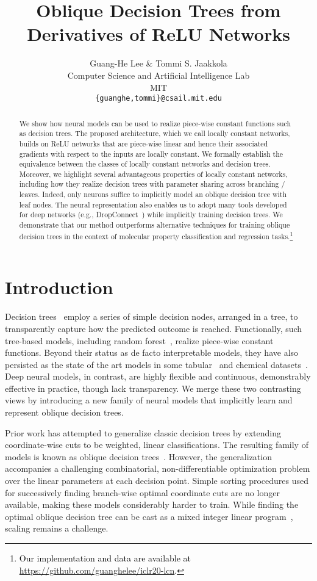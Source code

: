 \documentclass{article} \usepackage{iclr2020_conference,times}
\title{Oblique Decision Trees from Derivatives of ReLU Networks}
\author{Guang-He Lee \& Tommi S. Jaakkola \\
Computer Science and Artificial Intelligence Lab\\
MIT\\
\texttt{\{guanghe,tommi\}@csail.mit.edu} \\
}
\newcommand{\camera}[1]{\textcolor{black}{#1}}
\begin{document}
\maketitle

\begin{abstract}
We show how neural models can be used to realize piece-wise constant functions such as decision trees. The proposed architecture, which we call locally constant networks, builds on ReLU networks that are piece-wise linear and hence their associated gradients with respect to the inputs are locally constant. We formally establish the equivalence between the classes of locally constant networks and decision trees. Moreover, we highlight several advantageous properties of locally constant networks, including how they realize decision trees with parameter sharing across branching / leaves. Indeed, only  neurons suffice to implicitly model an oblique decision tree with  leaf nodes. The neural representation also enables us to adopt many tools developed for deep networks (e.g., DropConnect~\citep{wan2013regularization}) while implicitly training decision trees. We demonstrate that our method outperforms alternative techniques for training oblique decision trees in the context of molecular property classification and regression tasks.\footnote{\camera{Our implementation and data are available at \url{https://github.com/guanghelee/iclr20-lcn}.}}
\end{abstract}

%
 \section{Introduction}

Decision trees~\citep{cart84} employ a series of simple decision nodes, arranged in a tree, to transparently capture how the predicted outcome is reached. Functionally, such tree-based models, including random forest~\citep{breiman2001random}, realize piece-wise constant functions. Beyond their status as de facto interpretable models, they have also persisted as the state of the art models in some tabular~\citep{sandulescu2016predicting} and chemical datasets~\citep{wu2018moleculenet}. Deep neural models, in contrast, are highly flexible and continuous, demonstrably effective in practice, though lack transparency. We merge these two contrasting views by introducing a new family of neural models that implicitly learn and represent oblique decision trees. 

Prior work has attempted to generalize classic decision trees by extending coordinate-wise cuts to be weighted, linear classifications. The resulting family of models is known as oblique decision trees~\citep{murthy1993oc1}. However, the generalization accompanies a challenging combinatorial, non-differentiable optimization problem over the linear parameters at each decision point. Simple sorting procedures used for successively finding branch-wise optimal coordinate cuts are no longer available, making these models considerably harder to train. While finding the optimal oblique decision tree can be cast as a mixed integer linear program~\citep{bertsimas2017optimal}, scaling remains a challenge.  
\end{document}

